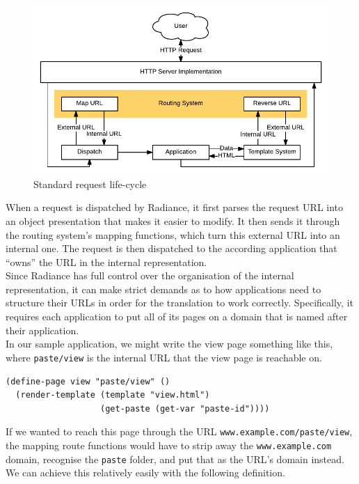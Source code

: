 \documentclass{sig-alternate}
\begin{document}
\begin{figure}[H]
  \includegraphics[width=\columnwidth]{request}
  \caption{Standard request life-cycle}
\end{figure}

When a request is dispatched by Radiance, it first parses the request URL into an object presentation that makes it easier to modify. It then sends it through the routing system's mapping functions, which turn this external URL into an internal one. The request is then dispatched to the according application that ``owns'' the URL in the internal representation. \\

Since Radiance has full control over the organisation of the internal representation, it can make strict demands as to how applications need to structure their URLs in order for the translation to work correctly. Specifically, it requires each application to put all of its pages on a domain that is named after their application. \\

In our sample application, we might write the view page something like this, where \texttt{paste/view} is the internal URL that the view page is reachable on.

\begin{verbatim}
(define-page view "paste/view" ()
  (render-template (template "view.html")
                   (get-paste (get-var "paste-id"))))
\end{verbatim}

If we wanted to reach this page through the URL \texttt{www.example.com/paste/view}, the mapping route functions would have to strip away the \texttt{www.example.com} domain, recognise the \texttt{paste} folder, and put that as the URL's domain instead. We can achieve this relatively easily with the following definition.
\end{document}
